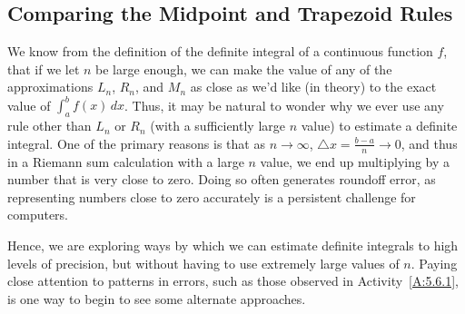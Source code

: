 \nin {}
\vspace*{1pt}

\newpage



\subsection*{Comparing the Midpoint and Trapezoid Rules}

We know from the definition of the definite integral of a continuous function $f$, that if we let $n$ be large enough, we can make the value of any of the approximations $L_n$, $R_n$, and $M_n$ as close as we'd like (in theory) to the exact value of $\int_a^b f(x) \, dx$.  Thus, it may be natural to wonder why we ever use any rule other than $L_n$ or $R_n$ (with a sufficiently large $n$ value) to estimate a definite integral.  One of the primary reasons is that as $n \to \infty$, $\triangle x = \frac{b-a}{n} \to 0$, and thus in a Riemann sum calculation with a large $n$ value, we end up multiplying by a number that is very close to zero.  Doing so often generates roundoff error, as representing numbers close to zero accurately is a persistent challenge for computers.

Hence, we are exploring ways by which we can estimate definite integrals to high levels of precision, but without having to use extremely large values of $n$.  Paying close attention to patterns in errors, such as those observed in Activity~\ref{A:5.6.1}, is one way to begin to see some alternate approaches.

